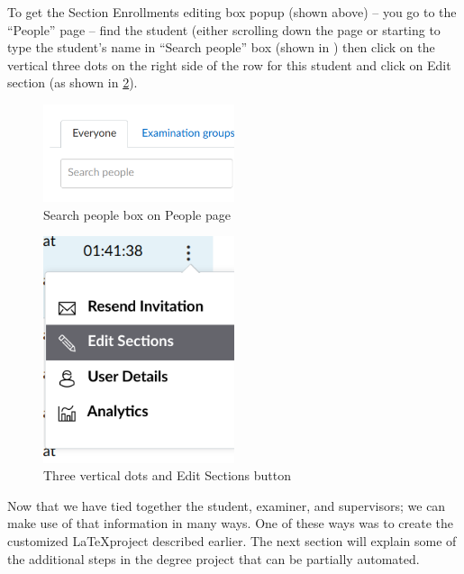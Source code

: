 To get the Section Enrollments editing box popup (shown above) – you go to the “People” page – find the student (either scrolling down the page or starting to type the student’s name in “Search people” box (shown in ) then click on the vertical three dots on the right side of the row for this student and click on Edit section (as shown in \cref{fig:editSectionsButton}).
\begin{figure}[!ht]
  \begin{center}
    \includegraphics[width=0.5\textwidth]{README_notes/README-examiner-figures/Search-people-Screenshot_20220325_161811.png}
  \end{center}
  \caption{Search people box on People page}
  \label{fig:peopleSearchbox}
\end{figure}
	
\begin{figure}[!ht]
  \begin{center}
    \includegraphics[width=0.5\textwidth]{README_notes/README-examiner-figures/edit-section-cmd-Screenshot_20220325_162252.png}
  \end{center}
  \caption{Three vertical dots and Edit Sections button}
  \label{fig:editSectionsButton}
\end{figure}
\FloatBarrier

Now that we have tied together the student, examiner, and supervisors; we can make use of that information in many ways. One of these ways was to create the customized \LaTeX\;project described earlier. The next section will explain some of the additional steps in the degree project that can be partially automated.
